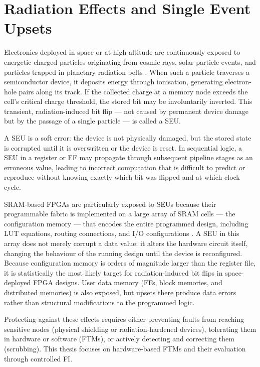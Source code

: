 \section{Radiation Effects and Single Event Upsets}
\label{chap2:radiation}

Electronics deployed in space or at high altitude are continuously exposed to energetic charged particles originating from cosmic rays, solar particle events, and particles trapped in planetary radiation belts \cite{Petersen2011}. When such a particle traverses a semiconductor device, it deposits energy through ionisation, generating electron-hole pairs along its track. If the collected charge at a memory node exceeds the cell's critical charge threshold, the stored bit may be involuntarily inverted. This transient, radiation-induced bit flip — not caused by permanent device damage but by the passage of a single particle — is called a \ac{SEU}.

A \ac{SEU} is a soft error: the device is not physically damaged, but the stored state is corrupted until it is overwritten or the device is reset. In sequential logic, a \ac{SEU} in a register or \ac{FF} may propagate through subsequent pipeline stages as an erroneous value, leading to incorrect computation that is difficult to predict or reproduce without knowing exactly which bit was flipped and at which clock cycle.

\ac{SRAM}-based \acp{FPGA} are particularly exposed to \acp{SEU} because their programmable fabric is implemented on a large array of \ac{SRAM} cells — the configuration memory — that encodes the entire programmed design, including \ac{LUT} equations, routing connections, and \ac{I/O} configurations \cite{Kastensmidt2006}. A \ac{SEU} in this array does not merely corrupt a data value: it alters the hardware circuit itself, changing the behaviour of the running design until the device is reconfigured. Because configuration memory is orders of magnitude larger than the register file, it is statistically the most likely target for radiation-induced bit flips in space-deployed \ac{FPGA} designs. User data memory (\acp{FF}, block memories, and distributed memories) is also exposed, but upsets there produce data errors rather than structural modifications to the programmed logic.

Protecting against these effects requires either preventing faults from reaching sensitive nodes (physical shielding or radiation-hardened devices), tolerating them in hardware or software (\acp{FTM}), or actively detecting and correcting them (scrubbing). This thesis focuses on hardware-based \acp{FTM} and their evaluation through controlled \ac{FI}.



